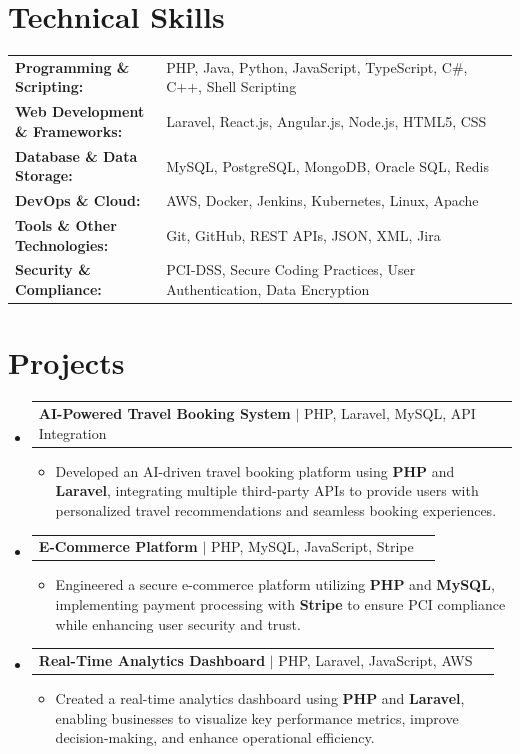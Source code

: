 \documentclass[letterpaper,10pt]{article}
\makeatletter
\newcommand{\resumeItem}[1]{
  \item{\fontsize{8pt}{9pt}\selectfont
    #1 \vspace{-3pt}
  }
}
\newcommand{\resumeProjectHeading}[2]{
    \item
    \begin{tabular*}{1.001\textwidth}{l@{\extracolsep{\fill}}r}
      \fontsize{8.5pt}{10pt}#1 & \textbf{\fontsize{8.5pt}{10pt} #2}\\
    \end{tabular*}\vspace{-7pt}
}
\newcommand{\resumeSubHeadingListStart}{\begin{itemize}[leftmargin=0pt, label={}]}
\newcommand{\resumeSubHeadingListEnd}{\end{itemize}}
\newcommand{\resumeItemListStart}{\begin{itemize}[leftmargin=*]}
\newcommand{\resumeItemListEnd}{\end{itemize}\vspace{-5pt}}
\makeatother
\begin{document}
\section{Technical Skills}
        \vspace{-14pt}
        \begin{table}[h]
            \fontsize{8pt}{9pt}\selectfont
            \begin{tabular}{p{0.3\linewidth} p{0.7\linewidth}}
                \textbf{Programming \& Scripting:} & PHP, Java, Python, JavaScript, TypeScript, C\#, C++, Shell Scripting \\
                \textbf{Web Development \& Frameworks:} & Laravel, React.js, Angular.js, Node.js, HTML5, CSS \\
                \textbf{Database \& Data Storage:} & MySQL, PostgreSQL, MongoDB, Oracle SQL, Redis \\
                \textbf{DevOps \& Cloud:} & AWS, Docker, Jenkins, Kubernetes, Linux, Apache \\
                \textbf{Tools \& Other Technologies:} & Git, GitHub, REST APIs, JSON, XML, Jira \\
                \textbf{Security \& Compliance:} & PCI-DSS, Secure Coding Practices, User Authentication, Data Encryption \\
            \end{tabular}
        \end{table}
 \vspace{-18pt}

\section{Projects}
    \vspace{-5pt}
    \resumeSubHeadingListStart
          \resumeProjectHeading
            {\textbf{AI-Powered Travel Booking System} $|$ PHP, Laravel, MySQL, API Integration}{}
            \resumeItemListStart
                \resumeItem{Developed an AI-driven travel booking platform using \textbf{PHP} and \textbf{Laravel}, integrating multiple third-party APIs to provide users with personalized travel recommendations and seamless booking experiences.}
            \resumeItemListEnd
        \vspace{-12pt}
    
        \resumeProjectHeading
            {\textbf{E-Commerce Platform} $|$ PHP, MySQL, JavaScript, Stripe}{}
        \resumeItemListStart
                \resumeItem{Engineered a secure e-commerce platform utilizing \textbf{PHP} and \textbf{MySQL}, implementing payment processing with \textbf{Stripe} to ensure PCI compliance while enhancing user security and trust.}
        \resumeItemListEnd
      \vspace{-12pt}
      \resumeProjectHeading
        {\textbf{Real-Time Analytics Dashboard} $|$ PHP, Laravel, JavaScript, AWS}{}
    \resumeItemListStart
            \resumeItem{Created a real-time analytics dashboard using \textbf{PHP} and \textbf{Laravel}, enabling businesses to visualize key performance metrics, improve decision-making, and enhance operational efficiency.}
    \resumeItemListEnd
    \resumeSubHeadingListEnd
\end{document}
